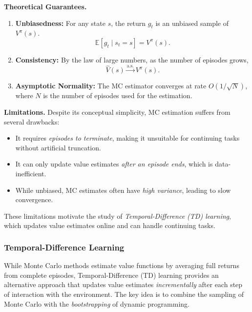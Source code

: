 \documentclass[
]{book}
\providecommand{\tightlist}{%
  \setlength{\itemsep}{0pt}\setlength{\parskip}{0pt}}
\theoremstyle{definition}
\theoremstyle{definition}
\theoremstyle{definition}
\theoremstyle{definition}
\theoremstyle{remark}
\begin{document}
\textbf{Theoretical Guarantees.}

\begin{enumerate}
\def\labelenumi{\arabic{enumi}.}
\tightlist
\item
  \textbf{Unbiasedness:} For any state \(s\), the return \(g_t\) is an unbiased sample of \(V^\pi(s)\).\\
  \[
  \mathbb{E}[g_t \mid s_t = s] = V^\pi(s).
  \]
\item
  \textbf{Consistency:} By the law of large numbers, as the number of episodes grows,
  \[
  \hat{V}(s) \xrightarrow{\text{a.s.}} V^\pi(s).
  \]
\item
  \textbf{Asymptotic Normality:} The MC estimator converges at rate \(O(1/\sqrt{N})\), where \(N\) is the number of episodes used for the estimation.
\end{enumerate}

\textbf{Limitations.} Despite its conceptual simplicity, MC estimation suffers from several drawbacks:

\begin{itemize}
\item
  It requires \emph{episodes to terminate}, making it unsuitable for continuing tasks without artificial truncation.
\item
  It can only update value estimates \emph{after an episode ends}, which is data-inefficient.
\item
  While unbiased, MC estimates often have \emph{high variance}, leading to slow convergence.
\end{itemize}

These limitations motivate the study of \emph{Temporal-Difference (TD) learning}, which updates value estimates online and can handle continuing tasks.

\subsubsection{Temporal-Difference Learning}\label{temporal-difference-learning}

While Monte Carlo methods estimate value functions by averaging full returns from complete episodes, Temporal-Difference (TD) learning provides an alternative approach that updates value estimates \emph{incrementally} after each step of interaction with the environment. The key idea is to combine the sampling of Monte Carlo with the \emph{bootstrapping} of dynamic programming.
\end{document}
